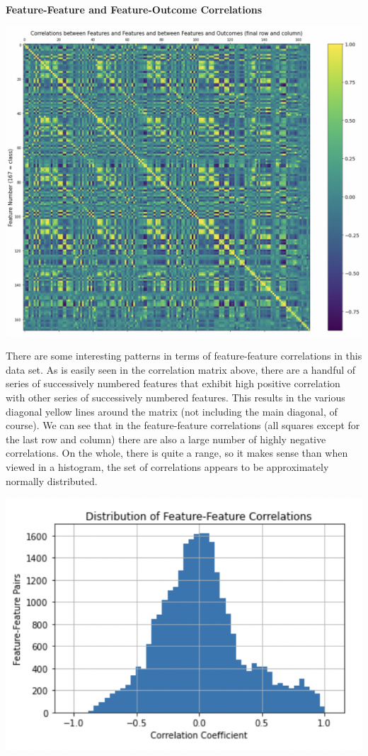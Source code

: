 \documentclass[12pt]{article}
\begin{document}
\textbf{Feature-Feature and Feature-Outcome Correlations}

\includegraphics[scale=.6]{correlation_matrix.jpg}

There are some interesting patterns in terms of feature-feature correlations in this data set. As is easily seen in the correlation matrix above, there are a handful of series of successively numbered features that exhibit high positive correlation with other series of successively numbered features. This results in the various diagonal yellow lines around the matrix (not including the main diagonal, of course). We can see that in the feature-feature correlations (all squares except for the last row and column) there are also a large number of highly negative correlations. On the whole, there is quite a range, so it makes sense than when viewed in a histogram, the set of correlations appears to be approximately normally distributed.

\includegraphics[scale=1.2]{feat_feat_corr_distrib.jpg}
\end{document}
